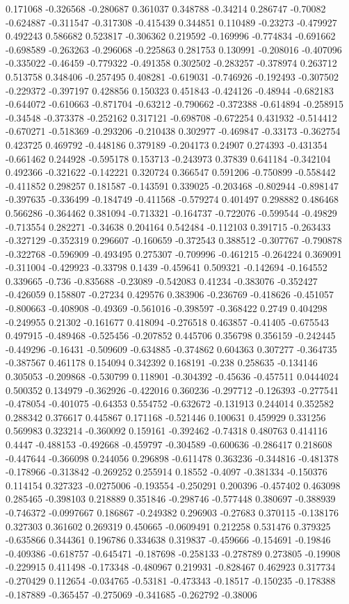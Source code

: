 0.171068 -0.326568 -0.280687 0.361037 0.348788 -0.34214 0.286747 -0.70082 -0.624887 -0.311547 -0.317308 -0.415439 0.344851 0.110489 -0.23273 -0.479927 0.492243 0.586682 0.523817 -0.306362 0.219592 -0.169996 -0.774834 -0.691662 -0.698589 -0.263263 -0.296068 -0.225863 0.281753 0.130991 -0.208016 -0.407096 -0.335022 -0.46459 -0.779322 -0.491358 0.302502 -0.283257 -0.378974 0.263712 0.513758 0.348406 -0.257495 0.408281 -0.619031 -0.746926 -0.192493 -0.307502 -0.229372 -0.397197 0.428856 0.150323 0.451843 -0.424126 -0.48944 -0.682183 -0.644072 -0.610663 -0.871704 -0.63212 -0.790662 -0.372388 -0.614894 -0.258915 -0.34548 -0.373378 -0.252162 0.317121 -0.698708 -0.672254 0.431932 -0.514412 -0.670271 -0.518369 -0.293206 -0.210438 0.302977 -0.469847 -0.33173 -0.362754 0.423725 0.469792 -0.448186 0.379189 -0.204173 0.24907 0.274393 -0.431354 -0.661462 0.244928 -0.595178 0.153713 -0.243973 0.37839 0.641184 -0.342104 0.492366 -0.321622 -0.142221 0.320724 0.366547 0.591206 -0.750899 -0.558442 -0.411852 0.298257 0.181587 -0.143591 0.339025 -0.203468 -0.802944 -0.898147 -0.397635 -0.336499 -0.184749 -0.411568 -0.579274 0.401497 0.298882 0.486468 0.566286 -0.364462 0.381094 -0.713321 -0.164737 -0.722076 -0.599544 -0.49829 -0.713554 0.282271 -0.34638 0.204164 0.542484 -0.112103 0.391715 -0.263433 -0.327129 -0.352319 0.296607 -0.160659 -0.372543 0.388512 -0.307767 -0.790878 -0.322768 -0.596909 -0.493495 0.275307 -0.709996 -0.461215 -0.264224 0.369091 -0.311004 -0.429923 -0.33798 0.1439 -0.459641 0.509321 -0.142694 -0.164552 0.339665 -0.736 -0.835688 -0.23089 -0.542083 0.41234 -0.383076 -0.352427 -0.426059 0.158807 -0.27234 0.429576 0.383906 -0.236769 -0.418626 -0.451057 -0.800663 -0.408908 -0.49369 -0.561016 -0.398597 -0.368422 0.2749 0.404298 -0.249955 0.21302 -0.161677 0.418094 -0.276518 0.463857 -0.41405 -0.675543 0.497915 -0.489468 -0.525456 -0.207852 0.445706 0.356798 0.356159 -0.242445 -0.449296 -0.16431 -0.509609 -0.634885 -0.374862 0.604363 0.307277 -0.364735 -0.387567 0.461178 0.154094 0.342392 0.168191 -0.238 0.258635 -0.134146 0.305053 -0.209868 -0.530799 0.118901 -0.304392 -0.45636 -0.457511 0.0444024 0.500352 0.134979 -0.362926 -0.422016 0.360236 -0.297712 -0.126393 -0.277541 -0.478054 -0.401075 -0.64353 0.554752 -0.632672 -0.131913 0.244014 0.352582 0.288342 0.376617 0.445867 0.171168 -0.521446 0.100631 0.459929 0.331256 0.569983 0.323214 -0.360092 0.159161 -0.392462 -0.74318 0.480763 0.414116 0.4447 -0.488153 -0.492668 -0.459797 -0.304589 -0.600636 -0.286417 0.218608 -0.447644 -0.366098 0.244056 0.296898 -0.611478 0.363236 -0.344816 -0.481378 -0.178966 -0.313842 -0.269252 0.255914 0.18552 -0.4097 -0.381334 -0.150376 0.114154 0.327323 -0.0275006 -0.193554 -0.250291 0.200396 -0.457402 0.463098 0.285465 -0.398103 0.218889 0.351846 -0.298746 -0.577448 0.380697 -0.388939 -0.746372 -0.0997667 0.186867 -0.249382 0.296903 -0.27683 0.370115 -0.138176 0.327303 0.361602 0.269319 0.450665 -0.0609491 0.212258 0.531476 0.379325 -0.635866 0.344361 0.196786 0.334638 0.319837 -0.459666 -0.154691 -0.19846 -0.409386 -0.618757 -0.645471 -0.187698 -0.258133 -0.278789 0.273805 -0.19908 -0.229915 0.411498 -0.173348 -0.480967 0.219931 -0.828467 0.462923 0.317734 -0.270429 0.112654 -0.034765 -0.53181 -0.473343 -0.18517 -0.150235 -0.178388 -0.187889 -0.365457 -0.275069 -0.341685 -0.262792 -0.38006 